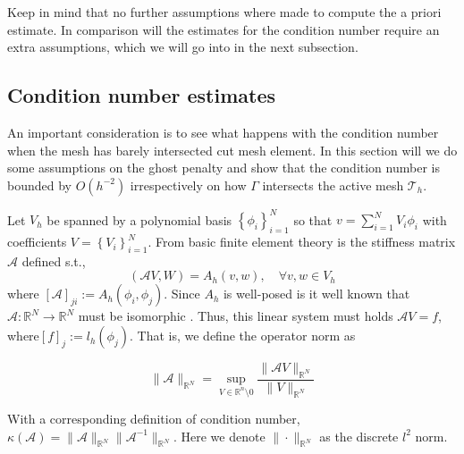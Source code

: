 \begin{remark}
    Keep in mind that no further assumptions where made to compute the a priori estimate. In comparison will the estimates for the condition number require an extra assumptions, which we will go into in the next subsection.
\end{remark}

\subsection{Condition number estimates}%
\label{sub:condition_number_estimates}


An important consideration is to see what happens with the condition number when the mesh has barely intersected cut mesh element. In this section will we do some assumptions on the ghost penalty and show that the condition number is bounded by $O( h^{-2}) $ irrespectively on how $\Gamma $ intersects the active mesh $\mathcal{T}_{h} $.

Let $V_{h}$ be spanned by a polynomial basis  $\left\{ \phi _{i}  \right\}_{i=1}^{N} $ so that $v = \sum_{i=1}^{N} V_{i}\phi _{i}$ with coefficients $V= \left\{ V_{i} \right\} _{i=1}^{N}$. From basic finite element theory is the stiffness matrix
$\mathcal{A} $ defined s.t.,
\[
    ( \mathcal{A} V, W)  = A_{h}( v,w), \quad \forall v,w \in V_{h}
\]
where $ \left[ \mathcal{A} \right] _{ji} := A_{h}( \phi _{i}, \phi_{j} )$.
Since $A_{h}$ is well-posed is it well known that $\mathcal{A}: \mathbb{R} ^{N} \to \mathbb{R} ^{N} $ must be isomorphic \cite{ern2006evaluation}.  Thus, this linear system must holds $ \mathcal{A} V = f$, where$\left[ f \right] _{j} := l_{h}(\phi_{j} )$. That is, we define the operator norm as


\begin{equation}
\label{eq:operator_norm}
 \| \mathcal{A}  \|_{ \mathbb{R} ^{N}  }^{  } = \sup_{V \in \mathbb{R} ^{n} \setminus 0 } \frac{\| \mathcal{A} V \|_{ \mathbb{R} ^{N} }^{  } }{\| V \|_{ \mathbb{R} ^{N} }^{  } }
\end{equation}

 With a corresponding definition of condition number, \( \kappa ( \mathcal{A} )  = \| \mathcal{A}  \|_{ \mathbb{R} ^{N} }^{  } \| \mathcal{A}^{-1}  \|_{ \mathbb{R} ^{N} }^{  }    \).
 Here we denote $\| \cdot  \|_{ \mathbb{R} ^{N} }^{  } $  as the discrete $l^{2}$ norm.

